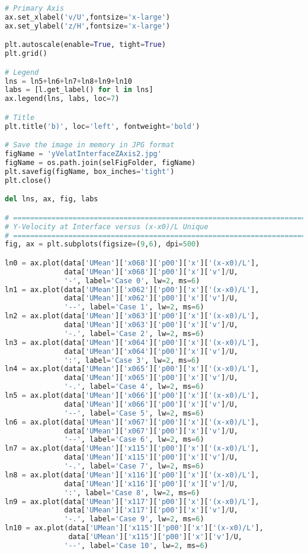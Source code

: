 \begin{lstlisting}[language=python]
# Primary Axis
ax.set_xlabel('v/U',fontsize='x-large')
ax.set_ylabel('z/H',fontsize='x-large')

plt.autoscale(enable=True, tight=True)
plt.grid()

# Legend
lns = ln5+ln6+ln7+ln8+ln9+ln10
labs = [l.get_label() for l in lns]
ax.legend(lns, labs, loc=7)

# Title
plt.title('b)', loc='left', fontweight='bold')

# Save the image in memory in JPG format
figName = 'yVelatInterfaceZAxis2.jpg'
figName = os.path.join(selFigFolder, figName)
plt.savefig(figName, box_inches='tight')
plt.close()

del lns, ax, fig, labs

# =============================================================================
# Y-Velocity at Interface versus (x-x0)/L Unique
# =============================================================================
fig, ax = plt.subplots(figsize=(9,6), dpi=500)

ln0 = ax.plot(data['UMean']['x068']['p00']['x']['(x-x0)/L'],
              data['UMean']['x068']['p00']['x']['v']/U,
              '-', label='Case 0', lw=2, ms=6)
ln1 = ax.plot(data['UMean']['x062']['p00']['x']['(x-x0)/L'],
              data['UMean']['x062']['p00']['x']['v']/U,
              '--', label='Case 1', lw=2, ms=6)
ln2 = ax.plot(data['UMean']['x063']['p00']['x']['(x-x0)/L'],
              data['UMean']['x063']['p00']['x']['v']/U,
              '-.', label='Case 2', lw=2, ms=6)
ln3 = ax.plot(data['UMean']['x064']['p00']['x']['(x-x0)/L'],
              data['UMean']['x064']['p00']['x']['v']/U,
              ':', label='Case 3', lw=2, ms=6)
ln4 = ax.plot(data['UMean']['x065']['p00']['x']['(x-x0)/L'],
              data['UMean']['x065']['p00']['x']['v']/U,
              '-.', label='Case 4', lw=2, ms=6)
ln5 = ax.plot(data['UMean']['x066']['p00']['x']['(x-x0)/L'],
              data['UMean']['x066']['p00']['x']['v']/U,
              '--', label='Case 5', lw=2, ms=6)
ln6 = ax.plot(data['UMean']['x067']['p00']['x']['(x-x0)/L'],
              data['UMean']['x067']['p00']['x']['v']/U,
              '--', label='Case 6', lw=2, ms=6)
ln7 = ax.plot(data['UMean']['x115']['p00']['x']['(x-x0)/L'],
              data['UMean']['x115']['p00']['x']['v']/U,
              '-.', label='Case 7', lw=2, ms=6)
ln8 = ax.plot(data['UMean']['x116']['p00']['x']['(x-x0)/L'],
              data['UMean']['x116']['p00']['x']['v']/U,
              ':', label='Case 8', lw=2, ms=6)
ln9 = ax.plot(data['UMean']['x117']['p00']['x']['(x-x0)/L'],
              data['UMean']['x117']['p00']['x']['v']/U,
              '-.', label='Case 9', lw=2, ms=6)
ln10 = ax.plot(data['UMean']['x115']['p00']['x']['(x-x0)/L'],
               data['UMean']['x115']['p00']['x']['v']/U,
              '--', label='Case 10', lw=2, ms=6)


\end{lstlisting}
